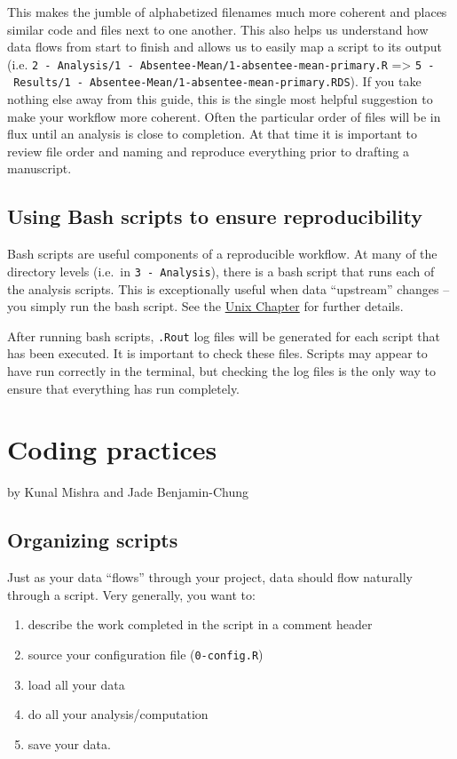 \documentclass[]{book}
\providecommand{\tightlist}{%
  \setlength{\itemsep}{0pt}\setlength{\parskip}{0pt}}
\begin{document}
This makes the jumble of alphabetized filenames much more coherent and
places similar code and files next to one another. This also helps us
understand how data flows from start to finish and allows us to easily
map a script to its output (i.e.
\texttt{2\ -\ Analysis/1\ -\ Absentee-Mean/1-absentee-mean-primary.R}
=\textgreater{}
\texttt{5\ -\ Results/1\ -\ Absentee-Mean/1-absentee-mean-primary.RDS}).
If you take nothing else away from this guide, this is the single most
helpful suggestion to make your workflow more coherent. Often the
particular order of files will be in flux until an analysis is close to
completion. At that time it is important to review file order and naming
and reproduce everything prior to drafting a manuscript.

\section{Using Bash scripts to ensure
reproducibility}\label{using-bash-scripts-to-ensure-reproducibility}

Bash scripts are useful components of a reproducible workflow. At many
of the directory levels (i.e.~in \texttt{3\ -\ Analysis}), there is a
bash script that runs each of the analysis scripts. This is
exceptionally useful when data ``upstream'' changes -- you simply run
the bash script. See the \protect\hyperlink{unix}{Unix Chapter} for
further details.

After running bash scripts, \texttt{.Rout} log files will be generated
for each script that has been executed. It is important to check these
files. Scripts may appear to have run correctly in the terminal, but
checking the log files is the only way to ensure that everything has run
completely.

\chapter{Coding practices}\label{coding-practices}

by Kunal Mishra and Jade Benjamin-Chung

\section{Organizing scripts}\label{organizing-scripts}

Just as your data ``flows'' through your project, data should flow
naturally through a script. Very generally, you want to:

\begin{enumerate}
\def\labelenumi{\arabic{enumi}.}
\tightlist
\item
  describe the work completed in the script in a comment header
\item
  source your configuration file (\texttt{0-config.R})
\item
  load all your data
\item
  do all your analysis/computation
\item
  save your data.
\end{enumerate}
\end{document}

